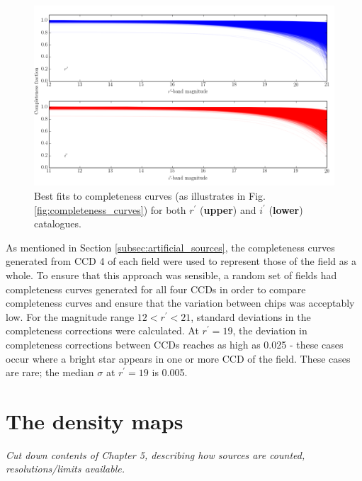 \documentclass[a4paper,useAMS,usenatbib]{mn2e}
\begin{document}
\begin{figure}
\begin{center}
\includegraphics[width=1\linewidth]{figures/completeness_fits2.png} 
\caption{\footnotesize Best fits to completeness curves (as illustrates in Fig. \ref{fig:completeness_curves}) for both $r^{\prime}$ (\textbf{upper}) and $i^{\prime}$ (\textbf{lower}) catalogues.}
\label{fig:completeness_fits}
\end{center}
\end{figure}

As mentioned in Section \ref{subsec:artificial_sources}, the completeness curves generated from CCD 4 of each field were used to represent those of the field as a whole. To ensure that this approach was sensible, a random set of fields had completeness curves generated for all four CCDs in order to compare completeness curves and ensure that the variation between chips was acceptably low. For the magnitude range $12<r^{\prime}<21$, standard deviations in the completeness corrections were calculated. At $r^{\prime}=19$, the deviation in completeness corrections between CCDs reaches as high as 0.025 - these cases occur where a bright star appears in one or more CCD of the field. These cases are rare; the median $\sigma$ at $r^{\prime}=19$ is 0.005.


\section[]{The density maps}
\label{sec:dmap}
\textsl{Cut down contents of Chapter 5, describing how sources are counted, resolutions/limits available.}
\end{document}
